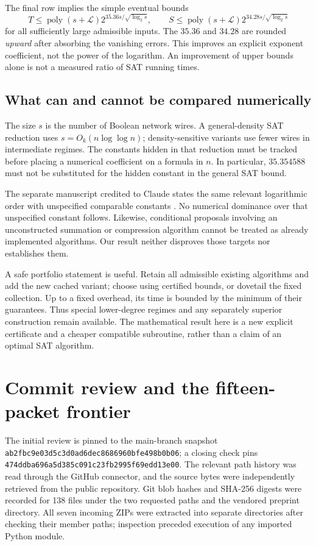 \documentclass[11pt,letterpaper]{article}
\theoremstyle{definition}\newtheorem{definition}[theorem]{Definition}
\theoremstyle{remark}\newtheorem{remark}[theorem]{Remark}
\newcommand{\poly}{\operatorname{poly}}
\begin{document}
The final row implies the simple eventual bounds
\[
 T\le\poly(s+\mathcal L)2^{35.36s/\sqrt{\log_2s}},\qquad
 S\le\poly(s+\mathcal L)2^{34.28s/\sqrt{\log_2s}}
\]
for all sufficiently large admissible inputs. The $35.36$ and $34.28$ are rounded
\emph{upward} after absorbing the vanishing errors. This improves an explicit exponent
coefficient, not the power of the logarithm. An improvement of upper bounds alone is
not a measured ratio of SAT running times.

\subsection{What can and cannot be compared numerically}
The size $s$ is the number of Boolean network wires. A general-density SAT reduction
uses $s=O_k(n\log\log n)$; density-sensitive variants use fewer wires in intermediate
regimes. The constants hidden in that reduction must be tracked before placing a numerical
coefficient on a formula in $n$. In particular, $35.354588$ must not be substituted for
the hidden constant in the general SAT bound.

The separate manuscript credited to Claude states the same relevant logarithmic order
with unspecified comparable constants \cite{claude}. No numerical dominance over that
unspecified constant follows. Likewise, conditional proposals involving an unconstructed
summation or compression algorithm cannot be treated as already implemented algorithms.
Our result neither disproves those targets nor establishes them.

A safe portfolio statement is useful. Retain all admissible existing algorithms and add
the new cached variant; choose using certified bounds, or dovetail the fixed collection.
Up to a fixed overhead, its time is bounded by the minimum of their guarantees. Thus
special lower-degree regimes and any separately superior construction remain available.
The mathematical result here is a new explicit certificate and a cheaper compatible
subroutine, rather than a claim of an optimal SAT algorithm.

\section{Commit review and the fifteen-packet frontier}
\label{sec:review}
The initial review is pinned to the main-branch snapshot
\nolinkurl{ab2fbc9e03d5c3d0ad6dec8686960bfe498b0b06}; a closing check pins
\nolinkurl{474ddba696a5d385c091c23fb2995f69edd13e00}. The relevant path history was
read through the GitHub connector, and the source bytes were independently retrieved
from the public repository. Git blob hashes and SHA-256 digests were recorded for 138
files under the two requested paths and the vendored preprint directory. All seven
incoming ZIPs were extracted into separate directories after checking their member paths;
inspection preceded execution of any imported Python module.
\end{document}
